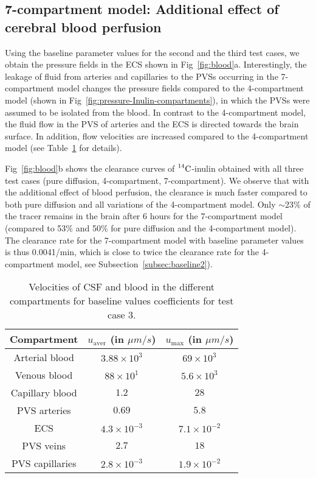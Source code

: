 \documentclass[a4paper,11pt]{article}
\newcommand{\1}{^{(1)}}
\newcommand{\2}{^{(2)}}
\newcommand{\Cinulin}{$\prescript{14}{}{\text{C}}$-inulin }
\begin{document}
\subsection{7-compartment model: Additional effect of cerebral blood perfusion}
Using the baseline parameter values for the second and the third test cases, we obtain the pressure fields in the ECS shown in Fig~\ref{fig:blood}a. Interestingly, the leakage of fluid from arteries and capillaries to the PVSs occurring in the 7-compartment model changes the pressure fields compared to the 4-compartment model (shown in Fig~\ref{fig:pressure-Inulin-compartments}), in which the PVSs were assumed to be isolated from the blood. In contrast to the 4-compartment model, the fluid flow in the PVS of arteries and the ECS is directed towards the brain surface. In addition, flow velocities are increased compared to the 4-compartment model (see Table~\ref{tab:velocities-withblood} for details). 

Fig~\ref{fig:blood}b shows the clearance curves of \Cinulin obtained with all three test cases (pure diffusion, 4-compartment, 7-compartment). 
We observe that with the additional effect of blood perfusion, the clearance is much faster compared to both pure diffusion and all variations of the 4-compartment model. Only $\sim$23\% of the tracer remains in the brain after 6 hours for the 7-compartment model (compared to 53\% and 50\% for pure diffusion and the 4-compartment model). The clearance rate for the 7-compartment model with baseline parameter values is thus 0.0041/min, which is close to twice the clearance rate for the 4-compartment model, see Subsection~\ref{subsec:baseline2}).

\begin{table}[h!]
    \centering
    \begin{tabular}{c|c|c}
       Compartment & $u_\text{aver}$ (in $\si{\mu m/s}$) & $u_\text{max}$ (in $\si{\mu m/s}$) \\
       \hline
        Arterial blood & $3.88 \times 10^3$ & $69 \times 10^3$\\
        Venous blood & $88 \times 10^1$ & $5.6 \times 10^3$ \\
        Capillary blood & $1.2$ & $28$\\
        PVS arteries & $0.69$ & $5.8$ \\
        ECS &  $4.3 \times 10^{-3}$ & $ 7.1  \times 10^{-2} $ \\
        PVS veins & $2.7$ & $18$ \\
        PVS capillaries & $2.8\times 10^{-3}$ & $1.9 \times 10^{-2}$
    \end{tabular}
    \caption{Velocities of CSF and blood in the different compartments for baseline values coefficients for test case 3.}
    \label{tab:velocities-withblood}
\end{table}
\end{document}
